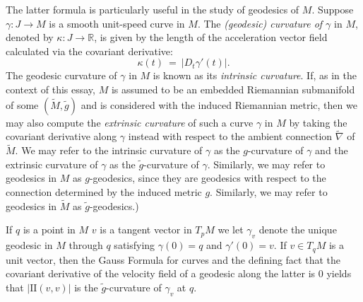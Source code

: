 \documentclass[11pt]{article}
\newcommand{\benn}{\begin{equation*}}
\newcommand{\eenn}{\end{equation*}}
\newcommand{\R}{\ensuremath{\mathbb{R}}}
\numberwithin{equation}{section}
\begin{document}
The latter formula is particularly useful in the study of geodesics of $M$. Suppose $\gamma: J \to M$ is a smooth unit-speed curve in $M$. The \emph{(geodesic) curvature of $\gamma$} in $M$, denoted by $\kappa: J \to \R$, is given by the length of the acceleration vector field calculated via the covariant derivative:
\benn
	\kappa(t) \ = \ | D_t \gamma'(t) |.
\eenn
The geodesic curvature of $\gamma$ in $M$ is known as its \emph{intrinsic curvature}. If, as in the context of this essay, $M$ is assumed to be an embedded Riemannian submanifold of some $(\tilde{M}, \tilde{g})$ and is considered with the induced Riemannian metric, then we may also compute the \emph{extrinsic curvature} of such a curve $\gamma$ in $M$ by taking the covariant derivative along $\gamma$ instead with respect to the ambient connection $\tilde{\nabla}$ of $\tilde{M}$. We may refer to the intrinsic curvature of $\gamma$ as the $g$-curvature of $\gamma$ and the extrinsic curvature of $\gamma$ as the $\tilde{g}$-curvature of $\gamma$. Similarly, we may refer to geodesics in $M$ as $g$-geodesics, since they are geodesics with respect to the connection determined by the induced metric $g$. Similarly, we may refer to geodesics in $\tilde{M}$ as $\tilde{g}$-geodesics.)

If $q$ is a point in $M$ $v$ is a tangent vector in $T_p M$ we let $\gamma_v$ denote the unique geodesic in $M$ through $q$ satisfying $\gamma(0) = q$ and $\gamma'(0) = v$. If $v \in T_q M$ is a unit vector, then the Gauss Formula for curves and the defining fact that the covariant derivative of the velocity field of a geodesic along the latter is 0 yields that $|\mathrm{II}(v, v)|$ is the $\tilde{g}$-curvature of $\gamma_v$ at $q$.
\end{document}
